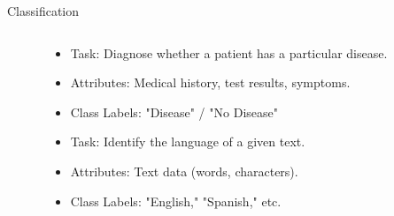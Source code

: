 \documentclass[aspectratio=169]{beamer}
\begin{document}
\begin{frame}{Classification}
\begin{columns}
\begin{column}{0.32\textwidth}
        \end{column}
        \begin{column}{0.32\textwidth}
            \begin{coloredblock}
                \begin{itemize}
                    \item \scriptsize Task: Diagnose whether a patient has a particular disease.
                    \item \scriptsize Attributes: Medical history, test results, symptoms.
                    \item \scriptsize Class Labels: "Disease" / "No Disease"
                \end{itemize}
            \end{coloredblock}
            \vspace{0.3cm}
            \begin{coloredblock}
                \begin{itemize}
                    \item \scriptsize Task: Identify the language of a given text.
                    \item \scriptsize Attributes: Text data (words, characters).
                    \item \scriptsize Class Labels: "English," "Spanish," etc.
                \end{itemize}
            \end{coloredblock}
        
        \end{column}
        \begin{column}{0.32\textwidth}
        

\end{column}
\end{columns}
\end{frame}
\end{document}
